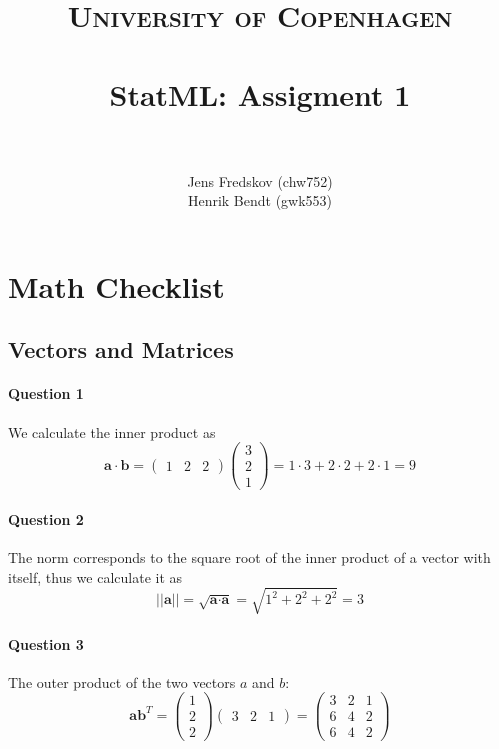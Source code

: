 \documentclass[a4paper, 11pt]{article}
\title{ 
\normalfont \normalsize 
\textsc{University of Copenhagen} \\ [25pt]
\horrule{0.5pt} \\[0.4cm]
\huge StatML: Assigment 1\\
\horrule{2pt} \\[0.5cm]
}
\author{Jens Fredskov (chw752)\\Henrik Bendt (gwk553)}
\newcommand{\vect}[1]{\textbf{#1}}
\begin{document}
\maketitle

\pagebreak
\section{Math Checklist}
\label{sec:math_checklist}

\subsection{Vectors and Matrices}
\label{sub:vectors_and_matrices}

\paragraph{Question 1}
We calculate the inner product as
\[
    \vect a \cdot \vect b = \begin{pmatrix} 1 & 2 & 2 \end{pmatrix}
                \begin{pmatrix} 3 \\ 2 \\ 1 \end{pmatrix}
              = 1 \cdot 3 + 2 \cdot 2 + 2 \cdot 1
              = 9
\]

\paragraph{Question 2}
The norm corresponds to the square root of the inner product of a vector with itself, thus we calculate it as
\[
    ||\vect a|| = \sqrt{\vect a \cdot \vect a} = \sqrt{1^2 + 2^2 + 2^2} = 3
\]

\paragraph{Question 3}
The outer product of the two vectors $a$ and $b$:
\[
    \vect a \vect b^T =  \begin{pmatrix} 1 \\ 2 \\ 2 \end{pmatrix}
            \begin{pmatrix} 3 & 2 & 1 \end{pmatrix}
         =  \begin{pmatrix} 
                3 & 2 & 1\\
                6 & 4 & 2\\
                6 & 4 & 2
            \end{pmatrix}
\]
\end{document}
